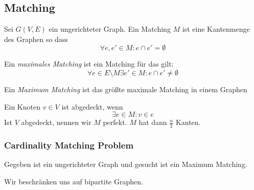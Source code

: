 \documentclass[11pt]{scrartcl}
\begin{document}
\subsection{Matching}

\begin{df}
Sei $G(V,E)$ ein ungerichteter Graph.
Ein Matching $M$ ist eine Kantenmenge des Graphen so dass
\[
\forall e,e'\in M : e \cap e' = \emptyset
\]
\end{df}
\begin{df}
Ein \emph{maximales Matching} ist ein Matching für das gilt:
\[
\forall e\in E\setminus M \exists e'\in M: e\cap e'\neq \emptyset
\]
\end{df}
\begin{df}
Ein \emph{Maximum Matching} ist das größte maximale Matching in einem Graphen
\end{df}
\begin{df}
Ein Knoten $v\in V$ ist abgedeckt, wenn
\[
\exists e\in M : v\in e
\]
Ist $V$ abgedeckt, nennen wir $M$ perfekt.
$M$ hat dann $\frac n2$ Kanten.
\end{df}

\subsubsection{Cardinality Matching Problem}
Gegeben ist ein ungerichteter Graph und gesucht ist ein Maximum Matching.

Wir beschränken uns auf bipartite Graphen.
\end{document}
